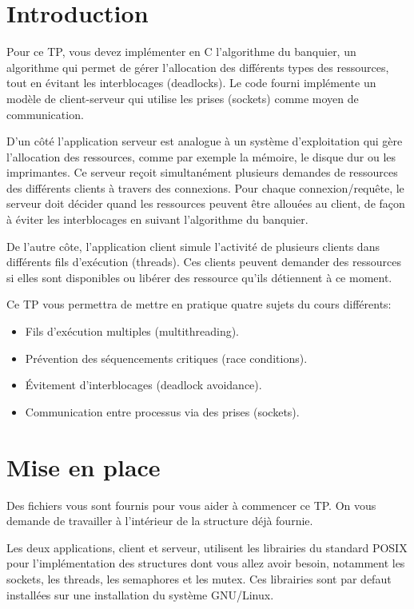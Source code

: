 \documentclass{article}
\begin{document}
\newpage
\section{Introduction}

Pour ce TP, vous devez implémenter en C l’algorithme du banquier, un
algorithme qui permet de gérer l’allocation des différents types des
ressources, tout en évitant les interblocages (deadlocks).  Le code fourni
implémente un modèle de client-serveur qui utilise les prises (sockets)
comme moyen de communication.

D’un côté l’application serveur est analogue à un système d’exploitation qui
gère l’allocation des ressources, comme par exemple la mémoire, le disque
dur ou les imprimantes.  Ce serveur reçoit simultanément plusieurs demandes
de ressources des différents clients à travers des connexions.  Pour chaque
connexion/requête, le serveur doit décider quand les ressources peuvent être
allouées au client, de façon à éviter les interblocages en suivant
l’algorithme du banquier.

De l’autre côte, l’application client simule l’activité de plusieurs clients
dans différents fils d’exécution (threads).  Ces clients peuvent demander des
ressources si elles sont disponibles ou libérer des ressource qu’ils
détiennent à ce moment.

Ce TP vous permettra de mettre en pratique quatre sujets du cours différents:
\begin{itemize}
\item Fils d’exécution multiples (multithreading).
\item Prévention des séquencements critiques (race conditions).
\item Évitement d’interblocages (deadlock avoidance).
\item Communication entre processus via des prises (sockets).
\end{itemize}

\section{Mise en place}

Des fichiers vous sont fournis pour vous aider à commencer ce TP.
On vous demande de travailler à l’intérieur de la structure déjà fournie.

Les deux applications, client et serveur, utilisent les librairies du
standard POSIX pour l’implémentation des structures dont vous allez avoir
besoin, notamment les sockets, les threads, les semaphores et les mutex.
Ces librairies sont par defaut installées sur une installation du système
GNU/Linux.
\end{document}
